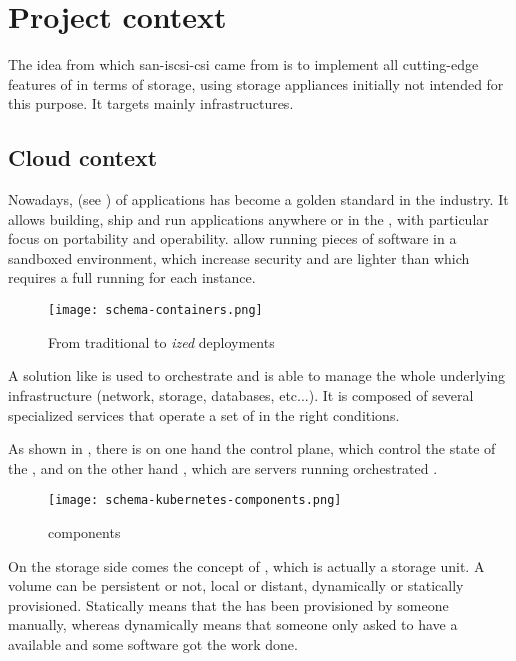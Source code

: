 \section{Project context}

The idea from which \gls{san-iscsi-csi} came from is to implement all cutting-edge features of  in terms of storage, using storage appliances initially not intended for this purpose. It targets mainly   infrastructures.

\subsection{Cloud context}

Nowadays,  (see ) of applications has become a golden standard in the industry. It allows building, ship and run applications anywhere  or in the , with particular focus on portability and operability.  allow running pieces of software in a sandboxed environment, which increase security and are lighter than  which requires a full  running for each instance.

\begin{figure}[h]
    \centering
    \texttt{[image: schema-containers.png]}
    \caption{From traditional to \emph{ized} deployments}
    \label{fig:containers}
\end{figure}

A solution like  is used to orchestrate  and is able to manage the whole underlying infrastructure (network, storage, databases, etc...). It is composed of several specialized services that operate a set of  in the right conditions.

As shown in , there is on one hand the control plane, which control the state of the , and on the other hand  , which are servers running orchestrated .

\begin{figure}[h]
    \centering
    \texttt{[image: schema-kubernetes-components.png]}
    \caption{ components}
    \label{fig:k8s-components}
\end{figure}

On the storage side comes the concept of , which is actually a storage unit. A volume can be persistent or not, local or distant, dynamically or statically provisioned. Statically means that the  has been provisioned by someone manually, whereas dynamically means that someone only asked to have a  available and some software got the work done.

